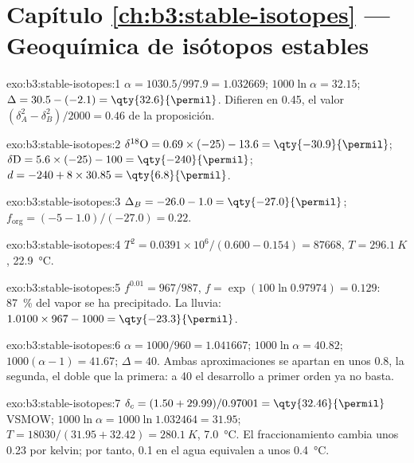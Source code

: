 \section*{Capítulo \ref{ch:b3:stable-isotopes} --- Geoquímica de isótopos estables}

\begin{solution}{exo:b3:stable-isotopes:1}
$\alpha = 1030.5/997.9 = 1.032669$; $1000\ln\alpha = 32.15$; $\Delta = 30.5 -
(-2.1) = \qty{32.6}{\permil}$. Difieren en \qty{0.45}{\permil}, el valor
$(\delta_A^2 - \delta_B^2)/2000 = 0.46$ de la proposición.
\end{solution}

\begin{solution}{exo:b3:stable-isotopes:2}
$\delta^{18}\mathrm O = 0.69\times(-25) - 13.6 = \qty{-30.9}{\permil}$;
$\delta\mathrm D = 5.6\times(-25) - 100 = \qty{-240}{\permil}$; $d = -240 +
8\times30.85 = \qty{6.8}{\permil}$.
\end{solution}

\begin{solution}{exo:b3:stable-isotopes:3}
$\Delta_B = -26.0 - 1.0 = \qty{-27.0}{\permil}$; $f_{\mathrm{org}} = (-5 -
1.0)/(-27.0) = 0.22$.
\end{solution}

\begin{solution}{exo:b3:stable-isotopes:4}
$T^2 = 0.0391\times10^6/(0.600 - 0.154) = \num{87668}$, $T = \qty{296.1}{K}$,
\qty{22.9}{\celsius}.
\end{solution}

\begin{solution}{exo:b3:stable-isotopes:5}
$f^{0.01} = 967/987$, $f = \exp(100\ln0.97974) = 0.129$: \qty{87}{\percent} del
vapor se ha precipitado. La lluvia: $1.0100\times967 - 1000 =
\qty{-23.3}{\permil}$.
\end{solution}

\begin{solution}{exo:b3:stable-isotopes:6}
$\alpha = 1000/960 = 1.041667$; $1000\ln\alpha = 40.82$; $1000(\alpha - 1) =
41.67$; $\Delta = 40$. Ambas aproximaciones se apartan en unos \qty{0.8}{\permil}, la
segunda, el doble que la primera: a \qty{40}{\permil} el desarrollo
a primer orden ya no basta.
\end{solution}

\begin{solution}{exo:b3:stable-isotopes:7}
$\delta_c = (1.50 + 29.99)/0.97001 = \qty{32.46}{\permil}$ VSMOW; $1000\ln\alpha
= 1000\ln1.032464 = 31.95$; $T = 18030/(31.95 + 32.42) = \qty{280.1}{K}$,
\qty{7.0}{\celsius}. El fraccionamiento cambia unos \qty{0.23}{\permil} por
kelvin; por tanto, \qty{0.1}{\permil} en el agua equivalen a unos \qty{0.4}{\celsius}.
\end{solution}


